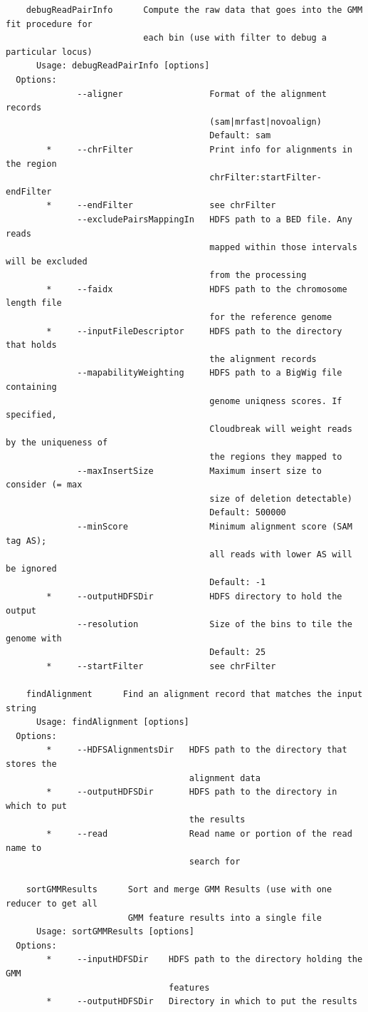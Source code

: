 \documentclass[11pt]{article}
\begin{document}
\begin{verbatim}
    debugReadPairInfo      Compute the raw data that goes into the GMM fit procedure for 
                           each bin (use with filter to debug a particular locus)
      Usage: debugReadPairInfo [options]
  Options:
              --aligner                 Format of the alignment records
                                        (sam|mrfast|novoalign)
                                        Default: sam
        *     --chrFilter               Print info for alignments in the region
                                        chrFilter:startFilter-endFilter
        *     --endFilter               see chrFilter
              --excludePairsMappingIn   HDFS path to a BED file. Any reads
                                        mapped within those intervals will be excluded
                                        from the processing
        *     --faidx                   HDFS path to the chromosome length file
                                        for the reference genome
        *     --inputFileDescriptor     HDFS path to the directory that holds
                                        the alignment records
              --mapabilityWeighting     HDFS path to a BigWig file containing
                                        genome uniqness scores. If specified,
                                        Cloudbreak will weight reads by the uniqueness of
                                        the regions they mapped to
              --maxInsertSize           Maximum insert size to consider (= max
                                        size of deletion detectable)
                                        Default: 500000
              --minScore                Minimum alignment score (SAM tag AS);
                                        all reads with lower AS will be ignored
                                        Default: -1
        *     --outputHDFSDir           HDFS directory to hold the output
              --resolution              Size of the bins to tile the genome with
                                        Default: 25
        *     --startFilter             see chrFilter

    findAlignment      Find an alignment record that matches the input string
      Usage: findAlignment [options]
  Options:
        *     --HDFSAlignmentsDir   HDFS path to the directory that stores the
                                    alignment data
        *     --outputHDFSDir       HDFS path to the directory in which to put
                                    the results
        *     --read                Read name or portion of the read name to
                                    search for

    sortGMMResults      Sort and merge GMM Results (use with one reducer to get all
                        GMM feature results into a single file
      Usage: sortGMMResults [options]
  Options:
        *     --inputHDFSDir    HDFS path to the directory holding the GMM
                                features
        *     --outputHDFSDir   Directory in which to put the results
\end{verbatim}
\end{document}
